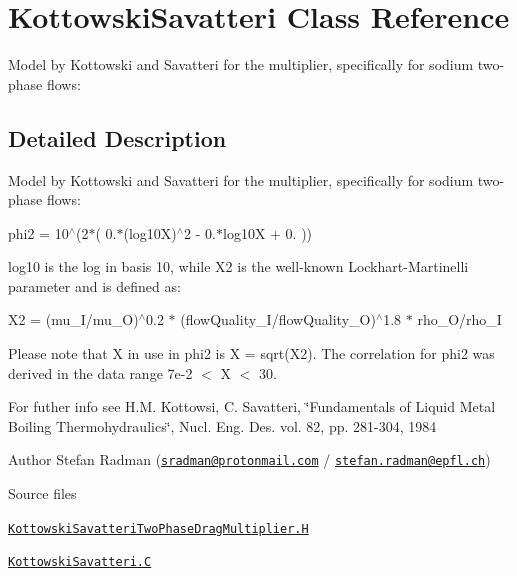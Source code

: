 \hypertarget{classFoam_1_1KottowskiSavatteri}{}\section{Kottowski\+Savatteri Class Reference}
\label{classFoam_1_1KottowskiSavatteri}


Model by Kottowski and Savatteri for the multiplier, specifically for sodium two-\/phase flows\+:  




\subsection{Detailed Description}
Model by Kottowski and Savatteri for the multiplier, specifically for sodium two-\/phase flows\+: 

\label{_Description}%
 phi2 = 10$^\wedge$(2$\ast$( 0.$\ast$(log10X)$^\wedge$2 -\/ 0.$\ast$log10X + 0. ))

log10 is the log in basis 10, while X2 is the well-\/known Lockhart-\/\+Martinelli parameter and is defined as\+:

X2 = (mu\+\_\+\+I/mu\+\_\+O)$^\wedge$0.2 $\ast$ (flow\+Quality\+\_\+\+I/flow\+Quality\+\_\+O)$^\wedge$1.8 $\ast$ rho\+\_\+\+O/rho\+\_\+I

Please note that X in use in phi2 is X = sqrt(\+X2). The correlation for phi2 was derived in the data range 7e-\/2 $<$ X $<$ 30.

For futher info see H.\+M. Kottowsi, C. Savatteri, \char`\"{}\+Fundamentals of Liquid
\+Metal Boiling Thermohydraulics\char`\"{}, Nucl. Eng. Des. vol. 82, pp. 281-\/304, 1984

Author Stefan Radman (\href{mailto:sradman@protonmail.com}{\tt sradman@protonmail.\+com} / \href{mailto:stefan.radman@epfl.ch}{\tt stefan.\+radman@epfl.\+ch})

\begin{DoxyParagraph}{Source files}

\begin{DoxyItemize}
\item \href{../../../home/carlo/data/GeN-Foam/GeN-Foam_ffn/GeN-Foam/GeN-Foam/classes/thermalHydraulics/src/physicsModels/dragModels/twoPhaseDragMultiplierModels/KottowskiSavatteri/KottowskiSavatteriTwoPhaseDragMultiplier.H}{\tt Kottowski\+Savatteri\+Two\+Phase\+Drag\+Multiplier.\+H} 
\item \href{../../../home/carlo/data/GeN-Foam/GeN-Foam_ffn/GeN-Foam/GeN-Foam/classes/thermalHydraulics/src/physicsModels/dragModels/twoPhaseDragMultiplierModels/KottowskiSavatteri/KottowskiSavatteri.C}{\tt Kottowski\+Savatteri.\+C} 
\end{DoxyItemize}
\end{DoxyParagraph}


